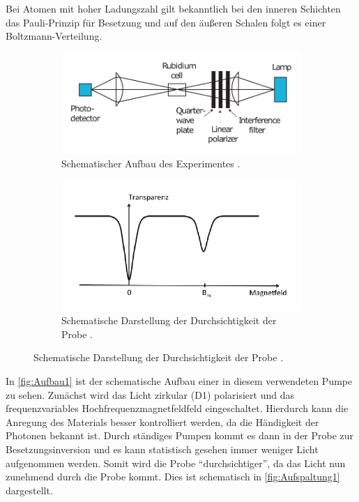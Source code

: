 Bei Atomen mit hoher Ladungszahl gilt bekanntlich bei den inneren Schichten das Pauli-Prinzip für Besetzung und
auf den äußeren Schalen folgt es einer Boltzmann-Verteilung.

\begin{figure}
    \begin{subfigure}{0.48\textwidth}
        \centering
        \includegraphics[width =\linewidth]{pictures/Aufbau1.pdf}
        \caption{Schematischer Aufbau des Experimentes \cite{optical_pumping}.}
        \label{fig:Aufbau1}
    \end{subfigure}
    \hfill
    \begin{subfigure}{0.48\textwidth}
        \centering
        \includegraphics[width =\linewidth]{pictures/Aufspaltung1.pdf}
        \caption{Schematische Darstellung der Durchsichtigkeit der Probe \cite{v21}.}
        \label{fig:Aufspaltung1}
    \end{subfigure}
\end{figure}

In \autoref{fig:Aufbau1} ist der schematische Aufbau einer in diesem verwendeten Pumpe zu sehen.
Zunächst wird das Licht zirkular (D1) polarisiert und das  frequenzvariables Hochfrequenzmagnetfeldfeld eingeschaltet.
Hierdurch kann die Anregung des Materials besser kontrolliert werden, da die Händigkeit der Photonen bekannt ist.
Durch ständiges Pumpen kommt es dann in der Probe zur Besetzungsinversion und es kann statistisch gesehen immer weniger Licht aufgenommen werden.
Somit wird die Probe \enquote{durchsichtiger}, da das Licht nun zunehmend durch die Probe kommt.
Dies ist schematisch in \autoref{fig:Aufspaltung1} dargestellt.

